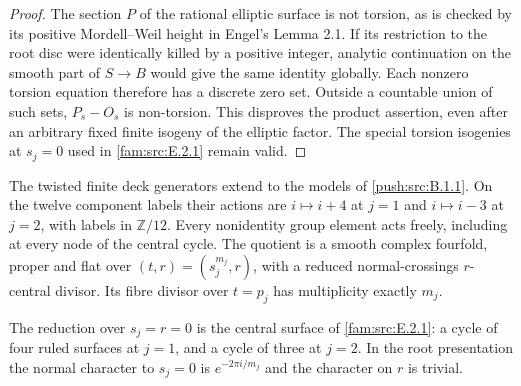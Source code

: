 \begin{proof}
The section $P$ of the rational elliptic surface is not
torsion, as is checked by its positive Mordell--Weil height
in Engel's Lemma 2.1. If its restriction to the root disc
were identically killed by a positive integer, analytic
continuation on the smooth part of $S\to B$ would give the
same identity globally. Each nonzero torsion equation
therefore has a discrete zero set. Outside a countable union
of such sets, $P_s-O_s$ is non-torsion. This disproves the
product assertion, even after an arbitrary fixed finite
isogeny of the elliptic factor. The special torsion
isogenies at $s_j=0$ used in \cref{fam:src:E.2.1} remain valid.
\end{proof}

\begin{theorem}\label{push:src:B.1.2}\label{push:B12}
The twisted finite deck generators extend to the models of
\ref{push:src:B.1.1}. On the twelve component labels their actions are
$i\mapsto i+4$ at $j=1$ and $i\mapsto i-3$ at $j=2$,
with labels in $\mathbb Z/12$. Every nonidentity group
element acts freely, including at every node of the central
cycle. The quotient is a smooth complex fourfold, proper
and flat over $(t,r)=(s_j^{m_j},r)$, with a reduced
normal-crossings $r$-central divisor. Its fibre divisor
over $t=p_j$ has multiplicity exactly $m_j$.

The reduction over $s_j=r=0$ is the central surface of \cref{fam:src:E.2.1}:
a cycle of four ruled surfaces at $j=1$, and a cycle of
three at $j=2$. In the root presentation the normal
character to $s_j=0$ is $e^{-2\pi i/m_j}$ and the
character on $r$ is trivial.
\end{theorem}

